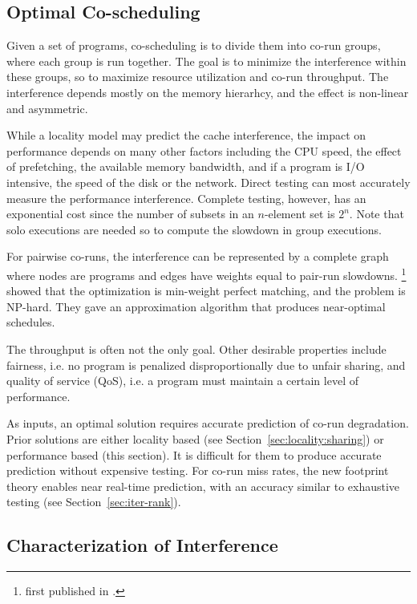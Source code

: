\subsection{Optimal Co-scheduling}


Given a set of programs, co-scheduling is to divide them into co-run
groups, where each group is run together.  The goal is to minimize the
interference within these groups, so to maximize resource utilization
and co-run throughput.  The interference depends mostly on the
memory hierarhcy, and the effect is non-linear and
asymmetric.  

While a locality model may predict the cache interference, the impact
on performance depends on many other factors including the CPU speed,
the effect of prefetching, the available memory bandwidth, and if a
program is I/O intensive, the speed of the disk or the network.
Direct testing can most accurately measure the performance
interference.  Complete testing, however, has an exponential cost
since the number of subsets in an $n$-element set is $2^n$.
Note that solo executions are needed so to compute the slowdown
in group executions.

For pairwise co-runs, the interference can be represented by a
complete graph where nodes are programs and edges have weights equal to
pair-run slowdowns. \citet{Jiang+:TPDS11}\footnote{first published in
  \citet{Jiang+:PACT08}.} showed that the optimization is min-weight
perfect matching, and the problem is NP-hard.  They gave an
approximation algorithm that produces near-optimal schedules.

The throughput is often not the only goal.  Other desirable properties
include fairness, i.e. no program is penalized disproportionally due
to unfair sharing, and quality of service (QoS), i.e. a program must
maintain a certain level of performance.

As inputs, an optimal solution requires accurate prediction of co-run
degradation.  Prior solutions are either locality based (see
Section~\ref{sec:locality:sharing}) or performance based (this
section).  It is difficult for them to produce accurate prediction
without expensive testing.  For co-run miss rates, the new footprint
theory enables near real-time prediction, with an accuracy similar
to exhaustive testing (see Section~\ref{sec:iter-rank}).

\subsection{Characterization of Interference}

